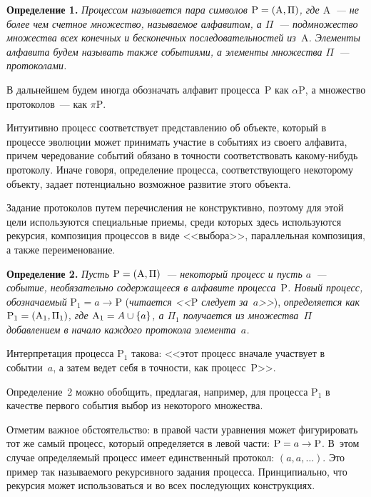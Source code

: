 \begin{multicols}{2}
    \noindent
    \textbf{Определение 1.} \textit{Процессом называется пара символов 
    $\mathrm{P}\hm= (\mathrm{A},\Pi)$,  где $\mathrm{A}$~--- не более чем счетное 
множество, называемое алфавитом, а $\Pi$~--- подмножество множества 
всех конечных и бесконечных последовательностей из~$\mathrm{A}$. Элементы 
алфавита будем называть также событиями, а элементы множества $\Pi$~--- 
протоколами.}
    
    В дальнейшем будем иногда обозначать алфавит процесса~P как $\alpha 
\mathrm{P}$, а множество протоколов~--- как $\pi \mathrm{P}$.
    
    Интуитивно процесс соответствует представлению об объекте, который 
в процессе эволюции может принимать участие в событиях из своего 
алфавита, причем чередование событий обязано в точности соответствовать 
ка\-ко\-му-ни\-будь протоколу. Иначе говоря, определение 
процесса, соответствующего некоторому объекту, задает потенциально 
возможное развитие этого объекта.
    
    Задание протоколов путем перечисления не конструктивно, поэтому для 
этой цели используются специальные приемы, среди которых здесь 
используются рекурсия, композиция процессов в виде <<выбора>>, 
параллельная композиция, а также переименование.
    
    \medskip
    
    \noindent
    \textbf{Определение 2.} \textit{Пусть $\mathrm{P}\hm=(\mathrm{A},\Pi)$~--- 
некоторый процесс и пусть $a$~--- событие, необязательно содержащееся в 
алфавите процесса~$\mathrm{P}$. Новый процесс, обозначаемый}
    $\mathrm{P}_1=a\rightarrow \mathrm{P} $
(\textit{читается <<$\mathrm{P}$ следует за~$a$>>}), \textit{определяется как 
$\mathrm{P}_1\hm=(\mathrm{A}_1,\Pi_1)$, где $\mathrm{A}_1\hm=A\cup 
\{a\}$, а $\Pi_1$ получается из множества~$\Pi$ добавлением в начало 
каждого протокола элемента~$a$.}
    
    Интерпретация процесса $\mathrm{P}_1$ такова: <<этот процесс вначале 
участвует в событии~$a$, а затем ведет себя в точности, как процесс~P>>.
    
    Определение~2 можно обобщить, предлагая, например,  для процесса 
$\mathrm{P}_1$ в качестве первого события выбор из некоторого множества.
    
    Отметим важное обстоятельство: в правой части уравнения может 
фигурировать тот же самый процесс, который определяется в левой части: 
$\mathrm{P}\hm=a\hm\rightarrow \mathrm{P}$. В~этом случае определяемый 
процесс имеет единственный протокол: $(a, a, \ldots)$. Это пример так 
называемого рекурсивного задания процесса. Принципиально, что рекурсия 
может использоваться и во всех последующих конструкциях.
    

\end{multicols}
